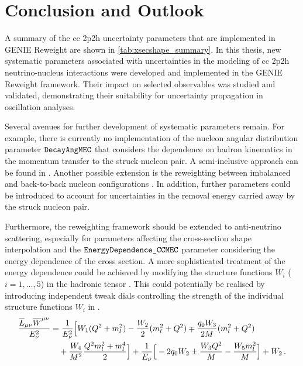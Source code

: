 \section{Conclusion and Outlook} \label{conclusion_syst}
A summary of the \acrshort{cc} \acrshort{2p2h} uncertainty parameters that are implemented in GENIE Reweight are shown in \cref{tab:xsecshape_summary}.
In this thesis, new systematic parameters associated with uncertainties in the modeling of \acrfull{cc} \acrshort{2p2h} neutrino-nucleus interactions were developed and implemented in the GENIE Reweight framework. Their impact on selected observables was studied and
validated, demonstrating their suitability for uncertainty propagation
in oscillation analyses.

Several avenues for further development of systematic parameters remain. 
For example, there is currently no implementation of the nucleon angular distribution parameter $\verb!DecayAngMEC!$ that considers the dependence on hadron kinematics in the momentum transfer to the struck nucleon pair. A semi-inclusive approach can be found in \cite{PhysRevC.109.015502}.
Another possible extension is the reweighting between imbalanced and back-to-back nucleon configurations \cite{Bathe-Peters:2022kkj}.
In addition, further parameters could be introduced to account for uncertainties in the removal energy carried away by the struck nucleon pair. 

Furthermore, the reweighting framework should be extended to anti-neutrino scattering, especially for parameters affecting the cross-section shape interpolation and the $\verb!EnergyDependence_CCMEC!$ parameter considering the energy dependence of the cross section. A more sophisticated treatment of the energy dependence could be achieved by modifying the structure functions $W_i$ ($i=1,\dots,5$) in the hadronic tensor \cite{osti_1996929}. This could potentially be realised by introducing independent tweak dials controlling the strength of the individual structure functions $W_i$ in .
%
\begin{align} \label{eq:vary_structure_func}
    \frac{\overline{L}_{\mu\nu} \overline{W}^{\mu\nu}}{E_\nu^2} 
    &=
    \frac{1}{E_\nu^2}\Big[
    W_1 (Q^2 + m_l^2)
    - \frac{W_2}{2}(m_l^2 + Q^2)
    \mp \frac{q_0 W_3}{2M} (m_l^2 + Q^2) \notag \\
    &\quad
    + \frac{W_4}{M^2} \frac{Q^2 m_l^2 + m_l^4}{2}
    \Big]
    + \frac{1}{E_\nu} \Big[
    -2q_0 W_2 \pm \frac{W_3 Q^2}{M}
    - \frac{W_5 m_l^2}{M}
    \Big]
    + W_2 \,.
    \end{align}
%


